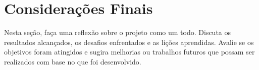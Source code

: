 \chapter{Considerações Finais}

Nesta seção, faça uma reflexão sobre o projeto como um todo. Discuta os resultados alcançados, os desafios enfrentados e as lições aprendidas. Avalie se os objetivos foram atingidos e sugira melhorias ou trabalhos futuros que possam ser realizados com base no que foi desenvolvido.